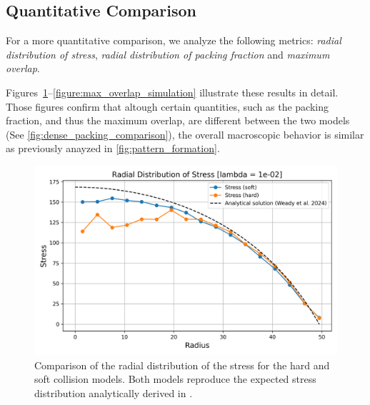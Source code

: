 \documentclass[conference]{IEEEtran}
\begin{document}
\cite{You2018}


\newpage

\subsection{Quantitative Comparison}

For a more quantitative comparison, we analyze the following metrics: \textit{radial distribution of stress}, \textit{radial distribution of packing fraction} and \textit{maximum overlap}.

Figures~\ref{figure:radial_distribution_stress}--\ref{figure:max_overlap_simulation} illustrate these results in detail. Those figures confirm that altough certain quantities, such as the packing fraction, and thus the maximum overlap, are different between the two models (See \autoref{fig:dense_packing_comparison}), the overall macroscopic behavior is similar as previously anayzed in \autoref{fig:pattern_formation}.


\begin{figure}[h]
    \centering
    \includegraphics[width=\linewidth]{figures/comparisons/radial_distribution_stress.png}
    \caption{Comparison of the radial distribution of the stress for the hard and soft collision models. Both models reproduce the expected stress distribution analytically derived in \cite{Weady2024}.}
    \label{figure:radial_distribution_stress}
\end{figure}
\end{document}
